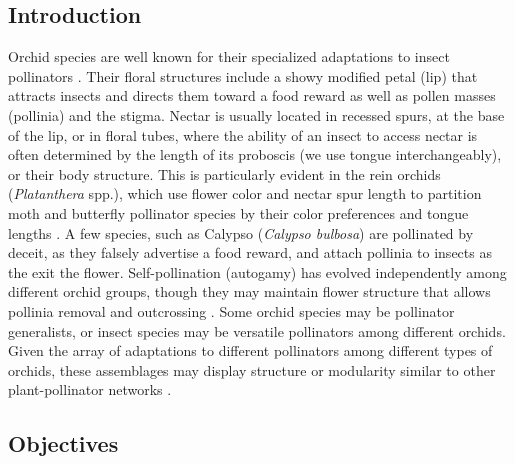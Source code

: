 \vspace{4mm}

\begin{multicols}{2}

\section{Introduction} 

Orchid species are well known for their specialized adaptations to
insect pollinators \citep[e.g.,][]{Darwin1862, Argue2012a, Argue2012b}. Their floral
structures include a showy modified petal (lip) that attracts insects
and directs them toward a food reward as well as pollen masses
(pollinia) and the stigma. Nectar is usually located in recessed spurs,
at the base of the lip, or in floral tubes, where the ability of an
insect to access nectar is often determined by the length of its
proboscis (we use tongue interchangeably), or their body structure. This
is particularly evident in the rein orchids (\emph{Platanthera} spp.),
which use flower color and nectar spur length to partition moth and
butterfly pollinator species by their color preferences and tongue
lengths \citep{HapemanInoue1997}. A few species, such as Calypso
(\emph{Calypso bulbosa}) are pollinated by deceit, as they falsely
advertise a food reward, and attach pollinia to insects as the exit the
flower. Self-pollination (autogamy) has evolved independently among
different orchid groups, though they may maintain flower structure that
allows pollinia removal and outcrossing \citep{Catling1983}. Some orchid
species may be pollinator generalists, or insect species may be
versatile pollinators among different orchids. Given the array of
adaptations to different pollinators among different types of orchids,
these assemblages may display structure or modularity similar to other
plant-pollinator networks \citep[e.g.,][]{Olesenetal2007}.

\subsection{Objectives}


\end{multicols}
